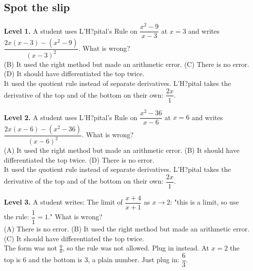 \documentclass[11pt]{article}
\begin{document}
\subsection*{Spot the slip}
\noindent\textbf{Level 1.} A student uses L'H?pital's Rule on $\dfrac{x^2-9}{x-3}$ at $x=3$ and writes $\dfrac{2x(x-3)-(x^2-9)}{(x-3)^2}$. What is wrong?\\  \quad (B) It used the right method but made an arithmetic error. \quad (C) There is no error. \quad (D) It should have differentiated the top twice.\\  \quad It used the quotient rule instead of separate derivatives. L'H?pital takes the derivative of the top and of the bottom on their own: $\dfrac{2x}{1}$.\par\medskip
\noindent\textbf{Level 2.} A student uses L'H?pital's Rule on $\dfrac{x^2-36}{x-6}$ at $x=6$ and writes $\dfrac{2x(x-6)-(x^2-36)}{(x-6)^2}$. What is wrong?\\ (A) It used the right method but made an arithmetic error. \quad (B) It should have differentiated the top twice. \quad {} \quad (D) There is no error.\\  \quad It used the quotient rule instead of separate derivatives. L'H?pital takes the derivative of the top and of the bottom on their own: $\dfrac{2x}{1}$.\par\medskip
\noindent\textbf{Level 3.} A student writes: The limit of $\dfrac{x+4}{x+1}$ as $x\to2$: "this is a limit, so use the rule: $\dfrac11=1$." What is wrong?\\ (A) There is no error. \quad (B) It used the right method but made an arithmetic error. \quad (C) It should have differentiated the top twice. \quad {}\\  \quad The form was not $\frac00$, so the rule was not allowed. Plug in instead. At $x=2$ the top is 6 and the bottom is 3, a plain number. Just plug in: $\dfrac{6}{3}$.\par\medskip
\end{document}
